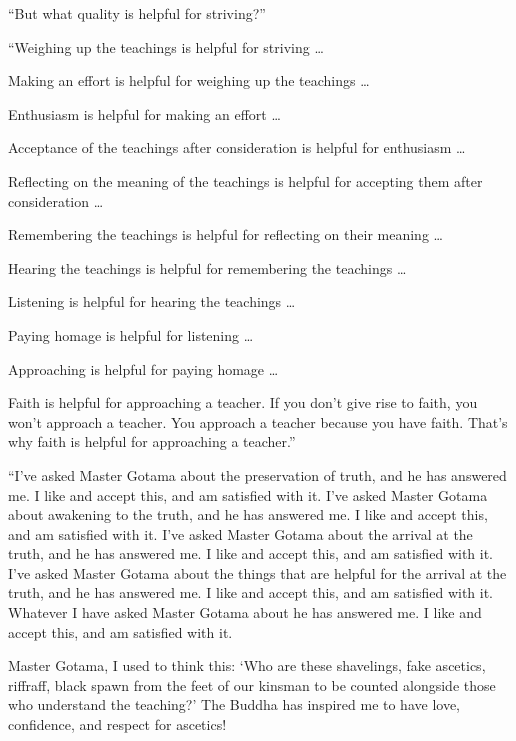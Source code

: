 \documentclass[12pt,openany]{book}%
\begin{document}
“But what quality is helpful for striving?” 

“Weighing up the teachings is helpful for striving … 

Making an effort is helpful for weighing up the teachings … 

Enthusiasm is helpful for making an effort … 

Acceptance of the teachings after consideration is helpful for enthusiasm … 

Reflecting on the meaning of the teachings is helpful for accepting them after consideration … 

Remembering the teachings is helpful for reflecting on their meaning … 

Hearing the teachings is helpful for remembering the teachings … 

Listening is helpful for hearing the teachings … 

Paying homage is helpful for listening … 

Approaching is helpful for paying homage … 

Faith is helpful for approaching a teacher. If you don’t give rise to faith, you won’t approach a teacher. You approach a teacher because you have faith. That’s why faith is helpful for approaching a teacher.” 

“I’ve asked Master Gotama about the preservation of truth, and he has answered me. I like and accept this, and am satisfied with it. I’ve asked Master Gotama about awakening to the truth, and he has answered me. I like and accept this, and am satisfied with it. I’ve asked Master Gotama about the arrival at the truth, and he has answered me. I like and accept this, and am satisfied with it. I’ve asked Master Gotama about the things that are helpful for the arrival at the truth, and he has answered me. I like and accept this, and am satisfied with it. Whatever I have asked Master Gotama about he has answered me. I like and accept this, and am satisfied with it. 

Master Gotama, I used to think this: ‘Who are these shavelings, fake ascetics, riffraff, black spawn from the feet of our kinsman to be counted alongside those who understand the teaching?’ The Buddha has inspired me to have love, confidence, and respect for ascetics! 
\end{document}
